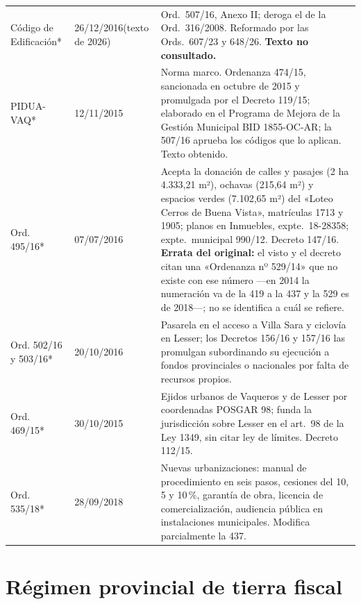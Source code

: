 \begin{longtable}{@{}p{3.2cm}p{1.9cm}p{7.9cm}@{}}
Código de Edificación* & 26/12/2016\newline (texto de 2026) & Ord.\ 507/16, Anexo II; deroga el de la Ord.\ 316/2008. Reformado por las Ords.\ 607/23 y 648/26. \textbf{Texto no consultado.} \\
PIDUA-VAQ* & 12/11/2015 & Norma marco. Ordenanza 474/15, sancionada en octubre de 2015 y promulgada por el Decreto 119/15; elaborado en el Programa de Mejora de la Gestión Municipal BID 1855-OC-AR; la 507/16 aprueba los códigos que lo aplican. Texto obtenido. \\
Ord. 495/16* & 07/07/2016 & Acepta la donación de calles y pasajes (2 ha 4.333,21 m²), ochavas (215,64 m²) y espacios verdes (7.102,65 m²) del «Loteo Cerros de Buena Vista», matrículas 1713 y 1905; planos en Inmuebles, expte.\ 18-28358; expte.\ municipal 990/12. Decreto 147/16. \textbf{Errata del original:} el visto y el decreto citan una «Ordenanza nº 529/14» que no existe con ese número ---en 2014 la numeración va de la 419 a la 437 y la 529 es de 2018---; no se identifica a cuál se refiere. \\
Ord. 502/16 y 503/16* & 20/10/2016 & Pasarela en el acceso a Villa Sara y ciclovía en Lesser; los Decretos 156/16 y 157/16 las promulgan subordinando su ejecución a fondos provinciales o nacionales por falta de recursos propios. \\
Ord. 469/15* & 30/10/2015 & Ejidos urbanos de Vaqueros y de Lesser por coordenadas POSGAR 98; funda la jurisdicción sobre Lesser en el art.\ 98 de la Ley 1349, sin citar ley de límites. Decreto 112/15. \\
Ord. 535/18* & 28/09/2018 & Nuevas urbanizaciones: manual de procedimiento en seis pasos, cesiones del 10, 5 y 10\,\%, garantía de obra, licencia de comercialización, audiencia pública en instalaciones municipales. Modifica parcialmente la 437. \\
\bottomrule
\end{longtable}

\section*{Régimen provincial de tierra fiscal}

